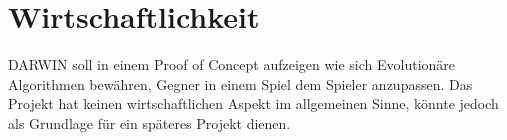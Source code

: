 \section{Wirtschaftlichkeit}
	DARWIN soll in einem Proof of Concept aufzeigen wie sich Evolutionäre Algorithmen bewähren, Gegner in einem Spiel dem Spieler anzupassen. Das Projekt hat keinen wirtschaftlichen Aspekt im allgemeinen Sinne, könnte jedoch als Grundlage für ein späteres Projekt dienen.